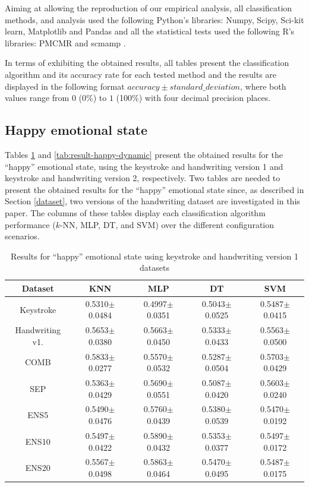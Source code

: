 \documentclass[conference]{IEEEtran}
\begin{document}
Aiming at allowing the reproduction of our empirical analysis, all classification methods, and analysis used the following Python’s libraries: Numpy, Scipy, Sci-kit learn, Matplotlib and  Pandas  \cite{numpy, scipy, sklearn, matplotlib, pandas} and all the statistical tests used the following  R’s libraries:  PMCMR and scmamp \cite{PMCMR, scmamp}. 

In terms of exhibiting the obtained results, all tables present the classification algorithm and its accuracy rate for each tested method and the results are displayed in the following format $accuracy\pm standard\_deviation$, where both values range from $0$ (0\%) to $1$ (100\%) with four decimal precision places.

\subsection{Happy emotional state}
\label{results-happy}

Tables \ref{tab:result-happy-full} and \ref{tab:result-happy-dynamic} present the obtained results for the ``happy'' emotional state,  using the keystroke and handwriting version 1 and keystroke and handwriting version 2, respectively. Two tables are needed to present the obtained results for the ``happy'' emotional state since, as described in Section \ref{dataset}, two versions of the handwriting dataset are investigated in this paper. The columns of these tables display each classification algorithm performance ($k$-NN, MLP, DT, and SVM) over the different configuration scenarios.

\begin{table}
    \centering
    \caption{Results for ``happy'' emotional state  using keystroke and handwriting version 1 datasets}
    \label{tab:result-happy-full}
    \begin{tabular}{|c|c|c|c|c|}
\hline
\textbf{Dataset}          & \textbf{KNN}        & \textbf{MLP}        & \textbf{DT}         & \textbf{SVM}        \\ \hline
Keystroke            & 0.5310$\pm$0.0484 & 0.4997$\pm$0.0351 & 0.5043$\pm$0.0525 & 0.5487$\pm$0.0415 \\ \hline
Handwriting v1. & 0.5653$\pm$0.0380 & 0.5663$\pm$0.0450 & 0.5333$\pm$0.0433 & 0.5563$\pm$0.0500 \\ \hline
COMB                  & 0.5833$\pm$0.0277 & 0.5570$\pm$0.0532 & 0.5287$\pm$0.0504 & 0.5703$\pm$0.0429 \\ \hline
SEP                & 0.5363$\pm$0.0429 & 0.5690$\pm$0.0551 & 0.5087$\pm$0.0420 & 0.5603$\pm$0.0240 \\ \hline
ENS5  & 0.5490$\pm$0.0476 & 0.5760$\pm$0.0439 & 0.5380$\pm$0.0539 & 0.5470$\pm$0.0192 \\ \hline
ENS10 & 0.5497$\pm$0.0422 & 0.5890$\pm$0.0432 & 0.5353$\pm$0.0377 & 0.5497$\pm$0.0172 \\ \hline
ENS20 & 0.5567$\pm$0.0498 & 0.5863$\pm$0.0464 & 0.5470$\pm$0.0495 & 0.5487$\pm$0.0175 \\ \hline
\end{tabular}%
\end{table} 
\end{document}
